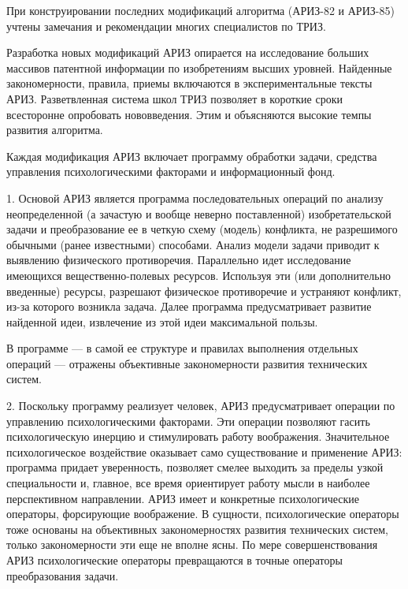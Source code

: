 При  конструировании   последних  модификаций  алгоритма   (АРИЗ-82  и
АРИЗ-85) учтены замечания и рекомендации многих специалистов по ТРИЗ.

Разработка   новых   модификаций   АРИЗ  опирается   на   исследование
больших   массивов  патентной   информации   по  изобретениям   высших
уровней.  Найденные  закономерности,   правила,  приемы  включаются  в
экспериментальные  тексты   АРИЗ.  Разветвленная  система   школ  ТРИЗ
позволяет в короткие сроки всесторонне опробовать нововведения. Этим и
объясняются высокие темпы развития алгоритма.

Каждая модификация АРИЗ включает  программу обработки задачи, средства
управления психологическими факторами и информационный фонд.

1.  Основой  АРИЗ  является  программа  последовательных  операций  по
анализу  неопределенной (а  зачастую  и  вообще неверно  поставленной)
изобретательской задачи  и преобразование  ее в четкую  схему (модель)
конфликта,  не  разрешимого  обычными  (ранее  известными)  способами.
Анализ модели  задачи приводит  к выявлению  физического противоречия.
Параллельно идет исследование  имеющихся вещественно-полевых ресурсов.
Используя  эти   (или  дополнительно  введенные)   ресурсы,  разрешают
физическое противоречие и устраняют  конфликт, из-за которого возникла
задача.  Далее  программа  предусматривает  развитие  найденной  идеи,
извлечение из этой идеи максимальной пользы.


В программе  — в  самой ее структуре  и правилах  выполнения отдельных
операций  — отражены  объективные закономерности  развития технических
систем.

2.  Поскольку   программу  реализует  человек,   АРИЗ  предусматривает
операции  по  управлению   психологическими  факторами.  Эти  операции
позволяют  гасить  психологическую   инерцию  и  стимулировать  работу
воображения. Значительное  психологическое воздействие  оказывает само
существование  и  применение   АРИЗ:  программа  придает  уверенность,
позволяет смелее  выходить за пределы узкой  специальности и, главное,
все   время  ориентирует   работу  мысли   в  наиболее   перспективном
направлении.  АРИЗ  имеет   и  конкретные  психологические  операторы,
форсирующие   воображение.  В   сущности,  психологические   операторы
тоже  основаны  на  объективных закономерностях  развития  технических
систем,  только  закономерности  эти  еще  не  вполне  ясны.  По  мере
совершенствования АРИЗ психологические операторы превращаются в точные
операторы преобразования задачи.

